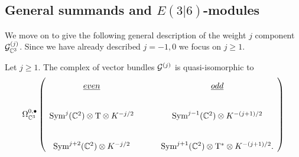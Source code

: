 %



\subsection{General summands and $E(3|6)$-modules}

We move on to give the following general description of the weight $j$ component $\mathcal{G}_{\mathbb{C}^3} ^{(j)}$.
Since we have already described $j = -1,0$ we focus on $j \geq 1$.

\begin{prop}
\label{prop:Vj}
Let $j \geq 1$. 
The complex of vector bundles $\mathcal{G}^{(j)}$ is quasi-isomorphic to
\begin{equation}
\label{eqn:Gj}
\Omega^{0,\bullet}_{\C^3} \left (\begin{tikzcd}
\ul{even} & \ul{odd} \\
\Sym^{j}(\C^2) \otimes \T \otimes K^{-j/2} & \Sym^{j-1}(\C^2) \otimes K^{-(j+1)/2}\\
\Sym^{j+2}(\C^2) \otimes K^{-j/2} & \Sym^{j+1}(\C^2) \otimes \T^* \otimes K^{-(j+1)/2} .
\end{tikzcd}\right )
\end{equation}
\end{prop}

